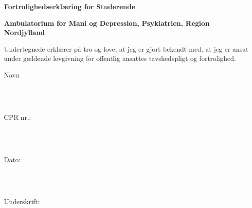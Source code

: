 \vspace{5cm}

{\centering \Large \textbf{Fortrolighedserklæring for Studerende} \\ \vspace{2cm}}

{\centering \large \textbf{Ambulatorium for Mani og Depression, Psykiatrien, Region Nordjylland} \\ \vspace{2cm}}

\noindent
Undertegnede erklærer på tro og love, at jeg er gjort bekendt med, at jeg er ansat under gældende lovgivning for offentlig ansattes tavshedspligt og fortrolighed.

\vspace{1cm}
\noindent
\vspace{5mm}
\parbox[h]{2cm}{Navn}\hspace{0.5cm} \makebox[7cm]{\hrulefill} \\ \\
\vspace{5mm}
\parbox[h]{2cm}{CPR nr.: }\hspace{0.5cm} \makebox[7cm]{\hrulefill} \\ \\
\vspace{5mm}
\parbox[h]{2cm}{Dato:}\hspace{0.5cm} \makebox[7cm]{\hrulefill} \\ \\
\vspace{5mm}
\parbox[h]{2cm}{Underskrift: }\hspace{0.5cm} \makebox[7cm]{\hrulefill} \\ \\
\vspace{5mm}